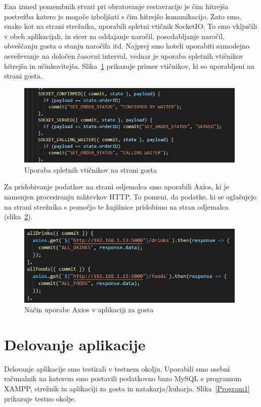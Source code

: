 \documentclass[a4paper, 12pt]{book}
\begin{document}
Ena izmed pomembnih stvari pri obratovanje restavracije je čim hitrejša postrežba katero je mogoče izboljšati s čim hitrejšo komunikacijo. Zato smo, enako kot na strani strežnika, uporabili spletni vtičnik SocketIO. To smo vključili v obeh aplikacijah, in sicer za oddajanje naročil, posodabljanje naročil, obveščanju gosta o stanju naročila itd. Najprej smo hoteli uporabiti samodejno osveževanje na določen časovni interval, vednar je uporaba spletnih vtičnikov hitrejša in učinkovitejša. Slika~\ref{socketioo1} prikazuje primer vtičnikov, ki so uporabljeni na strani gosta.

\begin{figure}[!htb]
\begin{center}
\includegraphics[width=11cm]{socketio_2.jpg}
\caption{Uporaba spletnih vtičnikov na strani gosta}
\label{socketioo1}
\end{center}
\end{figure}

Za pridobivanje podatkov na strani odjemalca smo uporabili Axios, ki je namenjen procesiranju zahtevkov  HTTP. To pomeni, da podatke, ki se oglašujejo na strani strežnika s pomočjo te knjižnice pridobimo na stran odjemalca (slika~\ref{axios_1}). 

\begin{figure}[!htb]
\begin{center}
\includegraphics[width=11cm]{axios_1.jpg}
\caption{Način uporabe Axios v aplikaciji za gosta}
\label{axios_1}
\end{center}
\end{figure}


\chapter {Delovanje aplikacije}
Delovanje aplikacije smo testirali v testnem okolju. Uporabili smo osebni računalnik na katerem smo postavili podatkovno bazo MySQL s programom XAMPP, strežnik in aplikaciji za gosta in natakarja/kuharja. Slika~\ref{Program1} prikazuje testno okolje.
\end{document}
